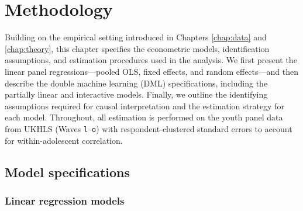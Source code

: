 \documentclass[11pt,oneside,a4paper]{book}
\newcommand{\bodychapter}[1]{%
  \chapter{#1}%
}
\newcommand{\tocsection}[2]{%
  \section[#1]{#2}%
}
\begin{document}
\bodychapter{Methodology}
\label{chap:methodology}


Building on the empirical setting introduced in Chapters \ref{chap:data} and \ref{chap:theory}, this chapter specifies the econometric models, identification assumptions, and estimation procedures used in the analysis. We first present the linear panel regressions—pooled OLS, fixed effects, and random effects—and then describe the double machine learning (DML) specifications, including the partially linear and interactive models. Finally, we outline the identifying assumptions required for causal interpretation and the estimation strategy for each model. Throughout, all estimation is performed on the youth panel data from UKHLS (Waves \texttt{l}–\texttt{o}) with respondent-clustered standard errors to account for within-adolescent correlation.

\tocsection{Model Specifications}{Model specifications}

\subsection[Linear Regression Models]{Linear regression models}
\label{sec:linear_regression_models}
\end{document}
